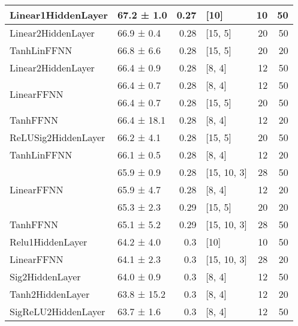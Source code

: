 \begin{longtable}{llrlrr}
 \hline
Linear1HiddenLayer                  & 67.2 ± 1.0  &  0.27 & [10]           &         10 &       50 \\
 \hline
Linear2HiddenLayer                  & 66.9 ± 0.4  &  0.28 & [15, 5]        &         20 &       50 \\
 \hline
TanhLinFFNN                         & 66.8 ± 6.6  &  0.28 & [15, 5]        &         20 &       20 \\
 \hline
Linear2HiddenLayer                  & 66.4 ± 0.9  &  0.28 & [8, 4]         &         12 &       50 \\
 \hline
\multirow{2}{*}{LinearFFNN}         & 66.4 ± 0.7  &  0.28 & [8, 4]         &         12 &       50 \\
                                            & 66.4 ± 0.7  &  0.28 & [15, 5]        &         20 &       50 \\
 \hline
TanhFFNN                            & 66.4 ± 18.1 &  0.28 & [8, 4]         &         12 &       20 \\
 \hline
ReLUSig2HiddenLayer                 & 66.2 ± 4.1  &  0.28 & [15, 5]        &         20 &       50 \\
 \hline
TanhLinFFNN                         & 66.1 ± 0.5  &  0.28 & [8, 4]         &         12 &       20 \\
 \hline
\multirow{3}{*}{LinearFFNN}         & 65.9 ± 0.9  &  0.28 & [15, 10, 3]    &         28 &       50 \\
                                            & 65.9 ± 4.7  &  0.28 & [8, 4]         &         12 &       20 \\
                                            & 65.3 ± 2.3  &  0.29 & [15, 5]        &         20 &       20 \\
 \hline
TanhFFNN                            & 65.1 ± 5.2  &  0.29 & [15, 10, 3]    &         28 &       50 \\
 \hline
Relu1HiddenLayer                    & 64.2 ± 4.0  &  0.3  & [10]           &         10 &       50 \\
 \hline
LinearFFNN                          & 64.1 ± 2.3  &  0.3  & [15, 10, 3]    &         28 &       20 \\
 \hline
Sig2HiddenLayer                     & 64.0 ± 0.9  &  0.3  & [8, 4]         &         12 &       50 \\
 \hline
Tanh2HiddenLayer                    & 63.8 ± 15.2 &  0.3  & [8, 4]         &         12 &       20 \\
 \hline
SigReLU2HiddenLayer                 & 63.7 ± 1.6  &  0.3  & [8, 4]         &         12 &       50 \\

\end{longtable}
